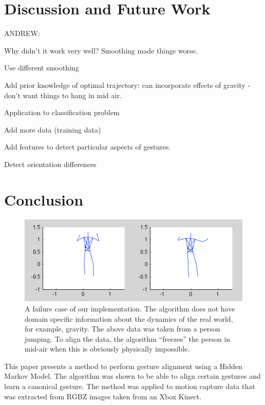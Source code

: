 \documentclass{article}
\begin{document}
\section{Discussion and Future Work}

ANDREW:

Why didn't it work very well? Smoothing made things worse.

Use different smoothing

Add prior knowledge of optimal trajectory: can incorporate effects of gravity
- don't want things to hang in mid air.

Application to classification problem

Add more data (training data)

Add features to detect particular aspects of gestures.

Detect orientation differences



\section{Conclusion}


\begin{figure}
\begin{centering}
\includegraphics[width=\columnwidth]{figures/jump.png}

\caption{A failure case of our implementation. The algorithm does not have
domain specific information about the dynamics of the real world, for example,
gravity. The above data was taken from a person jumping. To align the data,
the algorithm ``freezes'' the person in mid-air when this is obviously
physically impossible. \label{figure:jump}}

\end{centering}
\end{figure}

This paper presents a method to perform gesture alignment using a Hidden
Markov Model. The algorithm was shown to be able to align certain gestures and
learn a canonical gesture. The method was applied to motion capture data that
was extracted from RGBZ images taken from an Xbox Kinect.
\end{document}
